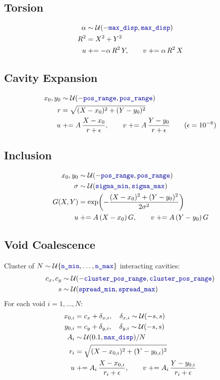 \documentclass[11pt]{article}
\newcommand{\param}[1]{\texttt{\color{blue!60!black}#1}}
\begin{document}
\subsection{Torsion}
\begin{align}
\alpha &\sim \mathcal{U}(-\param{max\_disp}, \param{max\_disp}) \\
R^2 &= X^2 + Y^2 \\
u &\mathrel{+}= -\alpha\,R^2\,Y, \qquad v \mathrel{+}= \alpha\,R^2\,X
\end{align}

\subsection{Cavity Expansion}
\begin{align}
x_0, y_0 &\sim \mathcal{U}(-\param{pos\_range}, \param{pos\_range}) \\
r &= \sqrt{(X-x_0)^2 + (Y-y_0)^2} \\
u &\mathrel{+}= A\,\frac{X - x_0}{r + \epsilon}, \qquad
v \mathrel{+}= A\,\frac{Y - y_0}{r + \epsilon} \qquad (\epsilon = 10^{-6})
\end{align}

\subsection{Inclusion}
\begin{align}
x_0, y_0 &\sim \mathcal{U}(-\param{pos\_range}, \param{pos\_range}) \\
\sigma &\sim \mathcal{U}(\param{sigma\_min}, \param{sigma\_max}) \\
G(X,Y) &= \exp\!\left(-\frac{(X-x_0)^2 + (Y-y_0)^2}{2\sigma^2}\right) \\
u &\mathrel{+}= A\,(X-x_0)\,G, \qquad v \mathrel{+}= A\,(Y-y_0)\,G
\end{align}

\subsection{Void Coalescence}
Cluster of $N \sim \mathcal{U}\{\param{n\_min},\dots,\param{n\_max}\}$ interacting cavities:
\begin{align}
c_x, c_y &\sim \mathcal{U}(-\param{cluster\_pos\_range}, \param{cluster\_pos\_range}) \\
s &\sim \mathcal{U}(\param{spread\_min}, \param{spread\_max})
\end{align}
For each void $i = 1, \dots, N$:
\begin{align}
x_{0,i} &= c_x + \delta_{x,i}, \quad \delta_{x,i} \sim \mathcal{U}(-s, s) \\
y_{0,i} &= c_y + \delta_{y,i}, \quad \delta_{y,i} \sim \mathcal{U}(-s, s) \\
A_i &\sim \mathcal{U}(0.1, \param{max\_disp}) / N \\
r_i &= \sqrt{(X-x_{0,i})^2 + (Y-y_{0,i})^2} \\
u &\mathrel{+}= A_i\,\frac{X - x_{0,i}}{r_i + \epsilon}, \qquad
v \mathrel{+}= A_i\,\frac{Y - y_{0,i}}{r_i + \epsilon}
\end{align}
\end{document}
